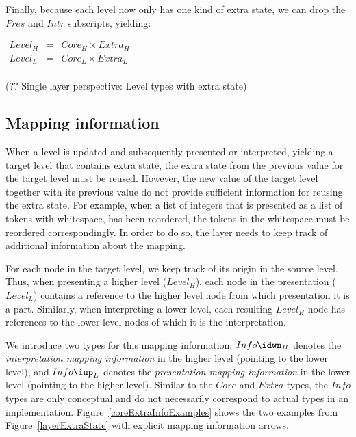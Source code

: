 Finally, because each level now only has one kind of extra state, we can drop the $Pres$ and $Intr$ subscripts, yielding:

\begin{small}\( \begin{array}{lcll}
Level_{H} & = & Core_{H} \times Extra_{H}\\
Level_{L} & = & Core_{L} \times Extra_{L}\\
\end{array}\)\end{small}
\begin{center}(?? Single layer perspective: Level types with extra state) \end{center}\vspace{1em}


%																
\subsection{Mapping information} \label{sect:mappingInformation}

When a level is updated and subsequently presented or interpreted, yielding a target level that contains extra state, the extra state from the previous value for the target level must be reused. However, the new value of the target level together with its previous value do not provide sufficient information for reusing the extra state. For example, when a list of integers that is presented as a list of tokens with whitespace, has been reordered, the tokens in the whitespace must be reordered correspondingly.  In order to do so, the layer needs to keep track of additional information about the mapping.

For each node in the target level, we keep track of its origin in the source level. Thus, when presenting a higher level ($Level_{H}$), each node in the presentation ($Level_{L}$) contains a reference to the higher level node from which presentation it is a part.  Similarly, when interpreting a lower level, each resulting $Level_{H}$ node has references to the lower level nodes of which it is the interpretation. 

We introduce two types for this mapping information: $Info\idwn_{H}$ denotes the {\em interpretation mapping information} in the higher level (pointing to the lower level), and $Info\iup_{L}$ denotes the {\em presentation mapping information} in the lower level (pointing to the higher level). Similar to the $Core$ and $Extra$ types, the $Info$ types are only conceptual and do not necessarily correspond to actual types in an implementation. Figure~\ref{coreExtraInfoExamples} shows the two examples from Figure~\ref{layerExtraState} with explicit mapping information arrows. 

